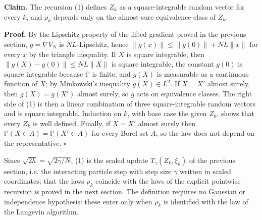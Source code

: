 \documentclass[11pt,a4paper]{article}
\begin{document}
\textbf{Claim.} The recursion (1) defines \(Z_k\) as a square-integrable random vector for every \(k\), and \(\rho_k\) depends only on the almost-sure equivalence class of \(Z_k\).




\textbf{Proof.} By the Lipschitz property of the lifted gradient proved in the previous section, \(g=\nabla V_N\) is \(NL\)-Lipschitz, hence \(\|g(x)\|\le\|g(0)\|+NL\|x\|\) for every \(x\) by the triangle inequality. If \(X\) is square integrable, then \(\|g(X)-g(0)\|\le NL\|X\|\) is square integrable, the constant \(g(0)\) is square integrable because \(\mathbb P\) is finite, and \(g(X)\) is measurable as a continuous function of \(X\); by Minkowski's inequality \(g(X)\in L^2\). If \(X=X'\) almost surely, then \(g(X)=g(X')\) almost surely, so \(g\) acts on equivalence classes. The right side of (1) is then a linear combination of three square-integrable random vectors and is square integrable. Induction on \(k\), with base case the given \(Z_0\), shows that every \(Z_k\) is well defined. Finally, if \(X=X'\) almost surely then \(\mathbb P(X\in A)=\mathbb P(X'\in A)\) for every Borel set \(A\), so the law does not depend on the representative. \(\square\)




Since \(\sqrt{2h}=\sqrt{2\gamma/N}\), (1) is the scaled update \(T_\gamma(Z_k,\xi_k)\) of the previous section, i.e. the interacting particle step with step size \(\gamma\) written in scaled coordinates; that the laws \(\rho_k\) coincide with the laws of the explicit pointwise recursion is proved in the next section. The definition requires no Gaussian or independence hypothesis: these enter only when \(\rho_k\) is identified with the law of the Langevin algorithm.
\end{document}
